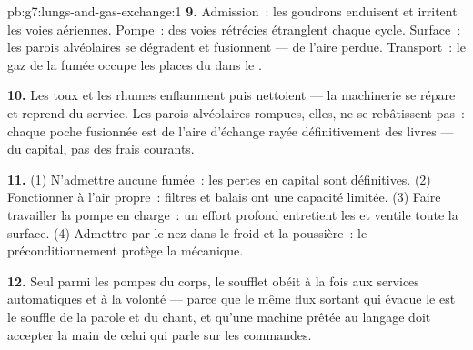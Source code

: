\begin{solution}{pb:g7:lungs-and-gas-exchange:1}
\textbf{9.} Admission~: les goudrons enduisent et irritent les voies
aériennes. Pompe~: des voies rétrécies étranglent chaque cycle.
Surface~: les parois alvéolaires se dégradent et fusionnent --- de
l'aire perdue. Transport~: le gaz de la fumée occupe les places du
 dans le .

\textbf{10.} Les toux et les rhumes enflamment puis nettoient --- la
machinerie se répare et reprend du service. Les parois alvéolaires
rompues, elles, ne se rebâtissent pas~: chaque poche fusionnée est
de l'aire d'échange rayée définitivement des livres --- du capital,
pas des frais courants.

\textbf{11.} (1) N'admettre aucune fumée~: les pertes en capital
sont définitives. (2) Fonctionner à l'air propre~: filtres et balais
ont une capacité limitée. (3) Faire travailler la pompe en charge~:
un effort profond entretient les  et ventile toute la
surface. (4) Admettre par le nez dans le froid et la poussière~: le
préconditionnement protège la mécanique.

\textbf{12.} Seul parmi les pompes du corps, le soufflet obéit à la
fois aux services automatiques et à la volonté --- parce que le même
flux sortant qui évacue le  est le souffle de la
parole et du chant, et qu'une machine prêtée au langage doit
accepter la main de celui qui parle sur les commandes.
\end{solution}
